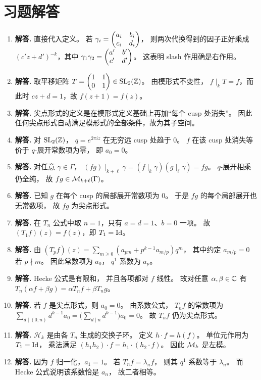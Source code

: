 \section*{习题解答}
\begin{enumerate}[label=\textbf{\arabic*.}, leftmargin=*, itemsep=1em]
\item \textbf{解答.} 直接代入定义。
若 $\gamma_i=\begin{pmatrix} a_i&b_i\\c_i&d_i \end{pmatrix}$，
则两次代换得到的因子正好乘成
$(c'z+d')^{-k}$，其中
$\gamma_1\gamma_2=\begin{pmatrix} a'&b'\\c'&d' \end{pmatrix}$。
这表明 slash 作用确是右作用。
\item \textbf{解答.} 取平移矩阵 $T=\begin{pmatrix} 1&1\\0&1 \end{pmatrix}\in \mathrm{SL}_2(\mathbb{Z})$。 由模形式不变性， $f\mid_k T=f$，而此时 $cz+d=1$，故 $f(z+1)=f(z)$。
\item \textbf{解答.} 尖点形式的定义是在模形式定义基础上再加“每个 cusp 处消失”。 因此任何尖点形式自动满足模形式的全部条件，故为其子空间。
\item \textbf{解答.} 对 $\mathrm{SL}_2(\mathbb{Z})$， $q=e^{2\pi iz}$ 在无穷远 cusp 处趋于 $0$。 $f$ 在该 cusp 处消失等价于 $q$-展开常数项为零， 即 $a_0=0$。
\item \textbf{解答.} 对任意 $\gamma\in\Gamma$， $(fg)\mid_{k+\ell}\gamma=(f\mid_k\gamma)(g\mid_\ell\gamma)=fg$。 $q$-展开相乘仍全纯， 故 $fg\in \mathcal{M}_{k+\ell}(\Gamma)$。
\item \textbf{解答.} 已知 $g$ 在每个 cusp 的局部展开常数项为 $0$。 于是 $fg$ 的每个局部展开也无常数项， 故 $fg$ 为尖点形式。
\item \textbf{解答.} 在 $T_n$ 公式中取 $n=1$，只有 $a=d=1$、$b=0$ 一项。 故 $(T_1f)(z)=f(z)$，即 $T_1=\mathrm{Id}$。
\item \textbf{解答.} 由 $(T_pf)(z)=\sum_{m\ge 0}(a_{pm}+p^{k-1}a_{m/p})q^m$， 其中约定 $a_{m/p}=0$ 若 $p\nmid m$。 因此常数项为 $a_0$， $q^1$ 系数为 $a_p$。
\item \textbf{解答.} Hecke 公式是有限和， 并且各项都对 $f$ 线性。 故对任意 $\alpha,\beta\in\mathbb{C}$ 有 $T_n(\alpha f+\beta g)=\alpha T_nf+\beta T_ng$。
\item \textbf{解答.} 若 $f$ 是尖点形式，则 $a_0=0$。 由系数公式， $T_nf$ 的常数项为 $\sum_{d\mid(0,n)}d^{k-1}a_0=\bigl(\sum_{d\mid n}d^{k-1}\bigr)a_0=0$。 故 $T_nf$ 仍为尖点形式。
\item \textbf{解答.} $\mathcal{H}_k$ 是由各 $T_n$ 生成的交换子环。 定义 $h\cdot f=h(f)$。 单位元作用为 $T_1=\mathrm{Id}$， 乘法满足 $(h_1h_2)\cdot f=h_1\cdot(h_2\cdot f)$。 因此 $\mathcal{M}_k$ 是左模。
\item \textbf{解答.} 因为 $f$ 归一化，$a_1=1$。 若 $T_nf=\lambda_nf$， 则其 $q^1$ 系数等于 $\lambda_n$。 而 Hecke 公式说明该系数恰是 $a_n$， 故二者相等。

\end{enumerate}
